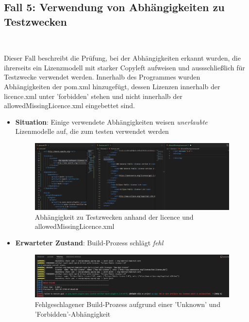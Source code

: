 \subsection{Fall 5: Verwendung von Abhängigkeiten zu Testzwecken} $~$

Dieser Fall beschreibt die Prüfung, bei der Abhängigkeiten erkannt wurden, die ihrerseits ein Lizenzmodell mit starker Copyleft aufweisen und aussschließlich für Testzwecke verwendet werden. Innerhalb des Programmes wurden Abhängigkeiten der pom.xml hinzugefügt, dessen Lizenzen innerhalb der licence.xml unter 'forbidden' stehen und nicht innerhalb der allowedMissingLicence.xml eingebettet sind. 

\begin{itemize}
    \item \textbf{Situation}: Einige verwendete Abhängigkeiten weisen \textit{unerlaubte} Lizenmodelle auf, die zum testen verwendet werden
    
    \begin{figure}[h]
        \centering
        \includegraphics[scale=0.37]{Bilder/Fall5Situation.png}
        \caption{Abhängigkeit zu Testzwecken anhand der licence und allowedMissingLicence.xml}
    \end{figure}

    \item \textbf{Erwarteter Zustand}: Build-Prozess schlägt \textit{fehl} 

    \begin{figure}[h]
        \centering
        \includegraphics[scale=0.4]{Bilder/Fall5Zustand.png}
        \caption{Fehlgeschlagener Build-Prozess aufgrund einer 'Unknown' und 'Forbidden'-Abhängigkeit}
    \end{figure}


\end{itemize}
